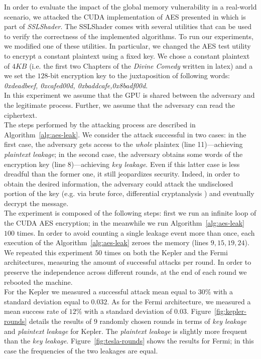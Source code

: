 \documentclass[11pt,onecolumn,letterpaper]{IEEEtran}
\begin{document}
In order to evaluate the impact of the global memory vulnerability in a real-world scenario, we attacked
the CUDA implementation of AES presented in \cite{Jang:2011:SCS:1972457.1972459} which is part of \emph{SSLShader}.  
The SSLShader comes with several utilities that can be used to verify the correctness of the implemented algorithms. 
To run our experiments, we modified one of these utilities. 
In particular, we changed the AES test utility to encrypt a constant plaintext using a fixed key. 
We chose a constant plaintext of $4KB$ (i.e. the first two Chapters of the \emph{Divine Comedy} written in latex) 
and a we set the $128$-bit encryption key to the juxtaposition of following words: \emph{0xdeadbeef, 0xcafed00d, 0xbaddcafe,0x8badf00d}. \\
In this experiment we assume that the GPU is shared between the adversary and the legitimate process. 
Further, we assume that the adversary can read the ciphertext. \\
The steps performed by the attacking process are described in Algorithm~\ref{alg:aes-leak}. 
We consider the attack successful in two cases:
in the first case, the adversary gets access to the \emph{whole} plaintex (line 11)---achieving \emph{plaintext leakage}; 
in the second case, the adversary obtains some words of the encryption key (line 8)---achieving \emph{key leakage}.
Even if this latter case is less dreadful than the former one, it still jeopardizes security. 
Indeed, in order to obtain the desired information, the adversary could attack the undisclosed portion of the key (e.g. via brute force, differential cryptanalysis \cite{Heys:2002:TLD:763194.763197}) and eventually decrypt the message. \\
The experiment is composed of the following steps: 
first we run an infinite loop of the CUDA AES encryption; 
in the meanwhile we run Algorithm~\ref{alg:aes-leak} $100$ times. 
In order to avoid counting a single leakage event more than once, each execution of the Algorithm~\ref{alg:aes-leak} zeroes the memory (lines $9,15,19,24$). 
We repeated this experiment $50$ times on both the Kepler and the Fermi architectures, measuring the amount of successful attacks per round. 
In order to preserve the independence across different rounds, at the end of each round we rebooted the machine. \\
For the Kepler we measured a successful attack mean equal to $30\%$ with a standard deviation equal to $0.032$.
As for the Fermi architecture, we measured a mean success rate of $12\%$ with a standard deviation of $0.03$. 
Figure~\ref{fig:kepler-rounds} details the results of $9$ randomly chosen rounds in terms of \emph{key leakage} and \emph{plaintext leakage} for Kepler. 
The \emph{plaintext leakage} is slightly more frequent than the \emph{key leakage}. 
Figure~\ref{fig:tesla-rounds} shows the results for Fermi; in this case the frequencies of the two leakages are equal. \\	
\end{document}
